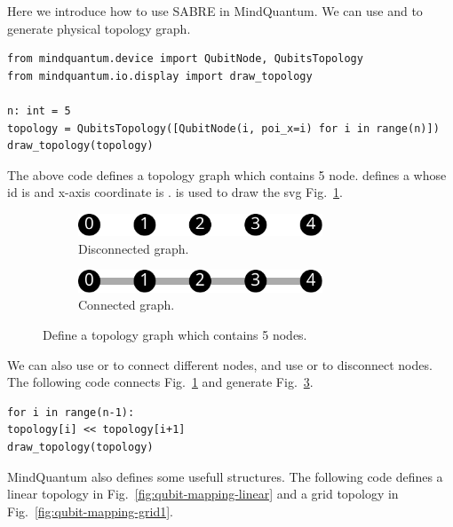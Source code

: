 Here we introduce how to use SABRE in MindQuantum. We can use  and  to generate physical topology graph.

\begin{lstlisting}
from mindquantum.device import QubitNode, QubitsTopology
from mindquantum.io.display import draw_topology

n: int = 5
topology = QubitsTopology([QubitNode(i, poi_x=i) for i in range(n)])
draw_topology(topology)
\end{lstlisting}

The above code defines a topology graph which contains 5 node.  defines a  whose id is  and x-axis coordinate is .  is used to draw the svg Fig.~\ref{fig:qubit-mapping-topo1}.

\begin{figure}
	\centering
	\begin{subfigure}{0.2\textwidth}
		\centering
		\includegraphics[width=0.8\textwidth]{8.2_figures/topo_1}
		\caption{Disconnected graph.}
		\label{fig:qubit-mapping-topo1}
	\end{subfigure}
	\begin{subfigure}{0.2\textwidth}
		\centering
		\includegraphics[width=0.8\textwidth]{8.2_figures/topo_2}
		\caption{Connected graph.}
		\label{fig:qubit-mapping-topo2}
	\end{subfigure}
	\caption{Define a topology graph which contains 5 nodes.}
\end{figure}

We can also use  or  to connect different nodes, and use  or  to disconnect nodes. The following code connects Fig.~\ref{fig:qubit-mapping-topo1} and generate Fig.~\ref{fig:qubit-mapping-topo2}.

\begin{lstlisting}
for i in range(n-1):
topology[i] << topology[i+1]
draw_topology(topology)
\end{lstlisting}

MindQuantum also defines some usefull structures. The following code defines a linear topology in Fig.~\ref{fig:qubit-mapping-linear} and a grid topology in Fig.~\ref{fig:qubit-mapping-grid1}.

